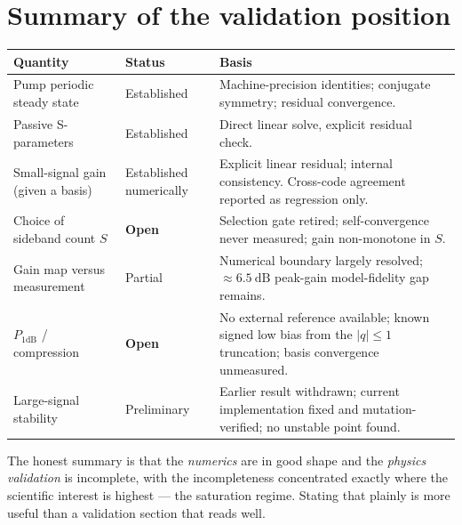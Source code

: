 \section{Summary of the validation position}

\begin{center}
\begin{tabular}{@{}l l p{}@{}}
\toprule
\textbf{Quantity} & \textbf{Status} & \textbf{Basis} \\
\midrule
Pump periodic steady state
& Established
& Machine-precision identities; conjugate symmetry; residual convergence. \\
\addlinespace
Passive S-parameters
& Established
& Direct linear solve, explicit residual check. \\
\addlinespace
Small-signal gain (given a basis)
& Established numerically
& Explicit linear residual; internal consistency. Cross-code agreement
  reported as regression only. \\
\addlinespace
Choice of sideband count $S$
& \textbf{Open}
& Selection gate retired; self-convergence never measured; gain non-monotone
  in $S$. \\
\addlinespace
Gain map versus measurement
& Partial
& Numerical boundary largely resolved; $\approx\SI{6.5}{\dB}$ peak-gain
  model-fidelity gap remains. \\
\addlinespace
$P_{1\mathrm{dB}}$ / compression
& \textbf{Open}
& No external reference available; known signed low bias from the $|q|\le1$
  truncation; basis convergence unmeasured. \\
\addlinespace
Large-signal stability
& Preliminary
& Earlier result withdrawn; current implementation fixed and
  mutation-verified; no unstable point found. \\
\bottomrule
\end{tabular}
\end{center}

The honest summary is that the \emph{numerics} are in good shape and the
\emph{physics validation} is incomplete, with the incompleteness concentrated
exactly where the scientific interest is highest --- the saturation regime.
Stating that plainly is more useful than a validation section that reads well.
